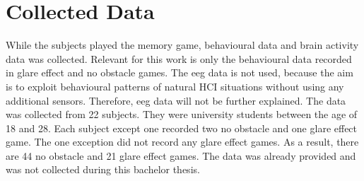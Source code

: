 \chapter{Collected Data}
\label{collected_data}
While the subjects played the memory game, behavioural data and brain activity data was collected. Relevant for this work is only the behavioural data recorded in glare effect and no obstacle games.
The eeg data is not used, because the aim is to exploit behavioural patterns of natural HCI situations without using any additional sensors. %
Therefore, eeg data will not be further explained. The data was collected from 22 subjects. They were university students between the age of 18 and 28. Each subject except one recorded two no obstacle and one glare effect game. The one exception did not record any glare effect games. As a result, there are 44 no obstacle and 21 glare effect games. The data was already provided and was not collected during this bachelor thesis.


